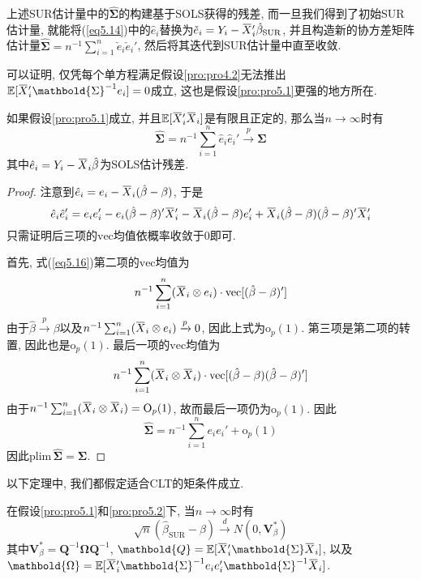 \documentclass[cn, 12pt, math=mtpro2, bibstyle=apa, blue, twocol]{elegantbook}
\newcommand{\E}{\mathbb{E}}
\newcommand{\Q}{\mathbold{Q}}
\newcommand{\hb}{\hat{\beta}}
\newcommand{\V}{\mathbold{V}}
\newcommand{\OX}{\overbar{X}}
\newcommand{\BS}{\mathbold{\Sigma}}
\newcommand{\overbar}[1]{\mkern 1.5mu\overline{\mkern-1.5mu#1\mkern-1.5mu}\mkern 1.5mu}
\begin{document}
上述SUR估计量中的$\hat{\mathbold{\Sigma}}$的构建基于SOLS获得的残差, 而一旦我们得到了初始SUR估计量, 就能将(\ref{eq5.14})中的$\hat{e}_i$替换为$\check{e}_i=Y_i-\overbar{X}_i'\hb_{\text{SUR}}$, 并且构造新的协方差矩阵估计量$\hat{\mathbold{\Sigma}}=n^{-1}\sum_{i=1}^{n}\check{e}_i\check{e}_i'$, 然后将其迭代到SUR估计量中直至收敛.

可以证明, 仅凭每个单方程满足假设\ref{pro:pro4.2}无法推出$\E[\overbar{X}_i'\mathbold{\Sigma}^{-1}e_i]=0$成立, 这也是假设\ref{pro:pro5.1}更强的地方所在.

\begin{theorem}
  如果假设\ref{pro:pro5.1}成立, 并且$\E[\overbar{X}_i'\overbar{X}_i]$是有限且正定的, 那么当$n\to\infty$时有
  $$\hat{\mathbold{\Sigma}}=n^{-1}\sum_{i=1}^{n}\hat{e}_i\hat{e}_i'\xrightarrow{p}\mathbold{\Sigma}$$
  其中$\hat{e}_i=Y_i-\overbar{X}_i\hat{\beta}$为SOLS估计残差.
\end{theorem}
\begin{proof}
  注意到$\hat{e}_i=e_i-\OX_i(\hb-\beta)$, 于是
  \begin{equation}\label{eq5.16}
    \hat{e}_i\hat{e}_i'=e_ie_i'-e_i(\hb-\beta)'\OX_i'-\OX_i(\hb-\beta)e_i'+\OX_i(\hb-\beta)(\hb-\beta)'\OX_i'
  \end{equation}
  只需证明后三项的$\text{vec}$均值依概率收敛于0即可.

  首先, 式(\ref{eq5.16})第二项的$\text{vec}$均值为
  $$n^{-1}\sum_{i=1}^{n}(\OX_i\otimes e_i)\cdot\text{vec}[(\hb-\beta)']$$
  由于$\hb\xrightarrow{p}\beta$以及$n^{-1}\sum_{i=1}^{n}(\OX_i\otimes e_i)\xrightarrow{p}0$, 因此上式为$\text{o}_p(1)$. 第三项是第二项的转置, 因此也是$\text{o}_p(1)$. 最后一项的$\text{vec}$均值为
  $$n^{-1}\sum_{i=1}^{n}(\OX_i\otimes\OX_i)\cdot\text{vec}[(\hb-\beta)(\hb-\beta)']$$
  由于$n^{-1}\sum_{i=1}^{n}(\OX_i\otimes\OX_i)=\text{O}_p(1)$, 故而最后一项仍为$\text{o}_p(1)$. 因此
  $$\hat{\BS}=n^{-1}\sum_{i=1}^{n}e_ie_i'+\text{o}_p(1)$$
  因此$\text{plim}\,\hat{\BS}=\BS$.

\end{proof}
以下定理中, 我们都假定适合CLT的矩条件成立.
\begin{theorem}\label{thm:thm5.2}
  在假设\ref{pro:pro5.1}和\ref{pro:pro5.2}下, 当$n\to\infty$时有
  $$\sqrt{n}(\hb_{\text{SUR}}-\beta)\xrightarrow{d}N(0,\V_\beta^\ast)$$
  其中$\V_\beta^\ast=\Q^{-1}\mathbold{\Omega}\Q^{-1}$, $\Q=\E[\overbar{X}_i'\mathbold{\Sigma}\overbar{X}_i]$, 以及$\mathbold{\Omega}=\E[\overbar{X}_i'\mathbold{\Sigma}^{-1}e_ie_i'\mathbold{\Sigma}^{-1}\overbar{X}_i]$.
\end{theorem}
\end{document}

